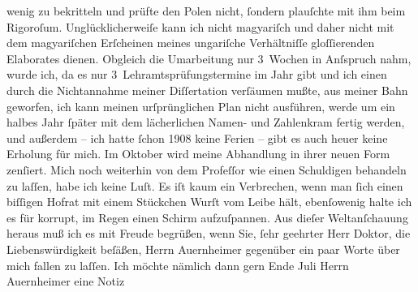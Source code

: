 \begin{ledgroupsized}[t]{13cm}
                    wenig zu bekritteln und prüfte den Polen nicht, ſondern plauſchte mit ihm beim
                    Rigoroſum. Unglücklicherweiſe kann ich nicht magyariſch und daher nicht mit dem magyariſchen Erſcheinen meines ungariſche Verhältniſſe gloſſierenden Elaborates dienen.\pend
           \pstart
           Obgleich die Umarbeitung nur 3 Wochen in Anſspruch nahm, wurde ich, da es nur
                    3 Lehramtsprüfungstermine im Jahr gibt und ich einen durch die Nichtannahme
                    meiner Diſſertation verſäumen mußte, aus meiner Bahn geworfen, ich kann meinen
                    urſprünglichen Plan nicht ausführen, werde um ein halbes Jahr ſpäter mit dem
                    lächerlichen Namen- und Zahlenkram fertig werden, und außerdem – ich hatte ſchon
                        1908 keine Ferien – gibt es auch heuer keine Erholung für mich.
                    Im Oktober wird meine Abhandlung in ihrer neuen Form zenſiert. Mich noch
                    weiterhin von dem Profeſſor wie einen Schuldigen behandeln zu laſſen, habe ich keine
                    Luſt. Es iſt kaum ein Verbrechen, wenn man ſich einen biſſigen Hofrat mit einem
                    Stückchen Wurſt vom Leibe hält, ebenſowenig halte ich es für korrupt, im Regen
                    einen Schirm aufzuſpannen. Aus dieſer Weltanſchauung heraus muß ich es mit
                    Freude begrüßen, wenn Sie, ſehr geehrter Herr Doktor, die Liebenswürdigkeit
                    beſäßen, Herrn Auernheimer gegenüber ein
                    paar Worte über mich fallen zu laſſen. Ich möchte nämlich dann gern Ende
                        Juli Herrn Auernheimer eine Notiz

\end{ledgroupsized}

